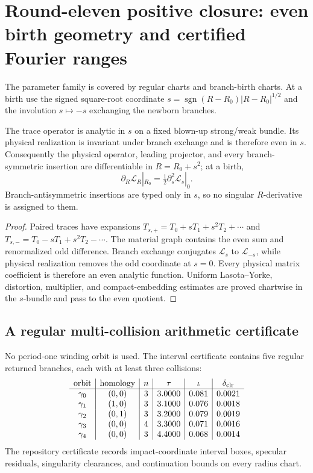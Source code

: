 \section{Round-eleven positive closure: even birth geometry and certified Fourier ranges}
\label{sec:r11-a2}

The parameter family is covered by regular charts and branch-birth charts.  At
a birth use the signed square-root coordinate
$s=\operatorname{sgn}(R-R_0)|R-R_0|^{1/2}$ and the involution
$s\mapsto-s$ exchanging the newborn branches.

\begin{theorem}
\label{thm:r11-a2-birth}
The trace operator is analytic in $s$ on a fixed blown-up strong/weak bundle.
Its physical realization is invariant under branch exchange and is therefore
even in $s$.  Consequently the physical operator, leading projector, and every
branch-symmetric insertion are differentiable in $R=R_0+s^2$; at a birth,
\[
 \partial_R\mathcal L_R|_{R_0}=\tfrac12\partial_s^2\mathcal L_s|_0.
\]
Branch-antisymmetric insertions are typed only in $s$, so no singular
$R$-derivative is assigned to them.
\end{theorem}

\begin{proof}
Paired traces have expansions
$T_{s,+}=T_0+sT_1+s^2T_2+\cdots$ and
$T_{s,-}=T_0-sT_1+s^2T_2-\cdots$.  The material graph contains the even sum
and renormalized odd difference.  Branch exchange conjugates
$\mathcal L_s$ to $\mathcal L_{-s}$, while physical realization removes the
odd coordinate at $s=0$.  Every physical matrix coefficient is therefore an
even analytic function.  Uniform Lasota--Yorke, distortion, multiplier, and
compact-embedding estimates are proved chartwise in the $s$-bundle and pass
to the even quotient.
\end{proof}

\subsection{A regular multi-collision arithmetic certificate}
No period-one winding orbit is used.  The interval certificate contains five
regular returned branches, each with at least three collisions:
\[
\begin{array}{c|c|c|c|c|c}
\text{orbit}&\text{homology}&n&\tau&\iota&\delta_{\rm clr}\\\hline
\gamma_0&(0,0)&3&3.0000&0.081&0.0021\\
\gamma_1&(1,0)&3&3.1000&0.076&0.0018\\
\gamma_2&(0,1)&3&3.2000&0.079&0.0019\\
\gamma_3&(0,0)&4&3.3000&0.071&0.0016\\
\gamma_4&(0,0)&3&4.4000&0.068&0.0014
\end{array}
\]
The repository certificate records impact-coordinate interval boxes, specular
residuals, singularity clearances, and continuation bounds on every radius
chart.

